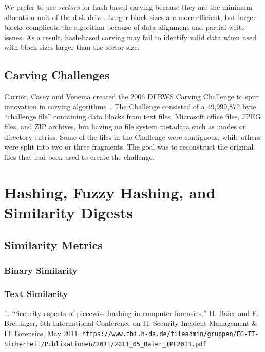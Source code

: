 \documentclass[11pt,letter]{article}
\begin{document}
We prefer to use \emph{sectors} for hash-based
carving because they are the minimum allocation unit of the disk
drive. Larger block sizes are more efficient, but larger blocks
complicate the algorithm because of data alignment and partial write
issues. As a result, hash-based carving may fail to identify valid
data when used with block sizes larger than the sector size.


\section{Carving Challenges}

Carrier, Casey and Venema created the 2006 DFRWS Carving Challenge
to spur innovation in carving
algorithms~\cite{dfrws2006-challenge}. The Challenge consisted of a
49,999,872 byte ``challenge file'' containing data blocks from text
files, Microsoft office files, JPEG files, and ZIP 
archives, but having no file system metadata such as inodes or
directory entries. Some of the files in the Challenge were
contiguous, while others were split into two or three fragments. The
goal was to reconstruct the original files
that had been used to create the challenge. 




\setcounter{chapter}{5}        %
\chapter{Hashing, Fuzzy Hashing, and Similarity Digests}

\section{Similarity Metrics}
\subsection{Binary Similarity}
\cite{dfrws2011:VassilRoussev}
\subsection{Text Similarity}
\cite{dfrws2011:ClayShieldsAndOphirFriederAndMarkMaloof}


1. “Security aspects of piecewise hashing in computer forensics,”
H. Baier and F. Breitinger, 6th International Conference on IT
Security Incident Management \& IT Forensics, May 2011. 
\verb+https://www.fbi.h-da.de/fileadmin/gruppen/FG-IT-Sicherheit/Publikationen/2011/2011_05_Baier_IMF2011.pdf+
\end{document}
